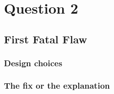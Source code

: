 \section{Question 2}
\subsection{First Fatal Flaw}

\subsubsection{Design choices}

\subsubsection{The fix or the explanation}